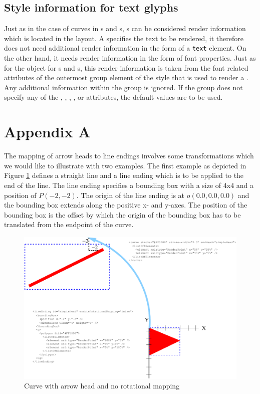 \subsection{Style information for text glyphs}
Just as in the case of curves in {\ReactionGlyph}s and {\SpeciesReferenceGlyph}s,
{\TextGlyph}s can be considered render information which is located
in the layout. A \TextGlyph specifies the text to be rendered,
it therefore does not need additional render information in the form of
a \texttt{text} element. On the other hand, it needs render information in the form of font properties.
Just as for the \RenderCurve
object for {\ReactionGlyph}s and {\SpeciesReferenceGlyph}s, this render information is
taken from the font related attributes of the outermost group element of the
style that is used to render a \TextGlyph. Any additional information within the
group is ignored. If the group does not specify any of the ,
, , , 
 or  attributes, the default values are to be used.


\section{Appendix A}

The mapping of arrow heads to line endings involves some transformations which we would like to illustrate with two examples.
The first example as depicted in Figure \ref{fig:2ArrowHeadMapping} defines a straight line and a line ending which is to be applied
to the end of the line. The line ending specifies a bounding box with a size of 4x4 and a position of $P(-2,-2)$. 
The origin of the line ending is at $o(0.0,0.0,0.0)$ and the bounding box extends along the positive x- and y-axes.
The position of the bounding box is the offset by which the origin of the bounding box has to be translated from the endpoint of the curve.

\begin{figure}[!ht]
\begin{center}
\includegraphics[scale=0.25]{figures/ArrowHeadMapping2}
\end{center}
\caption{Curve with arrow head and no rotational mapping} \label{fig:2ArrowHeadMapping}
\end{figure}

